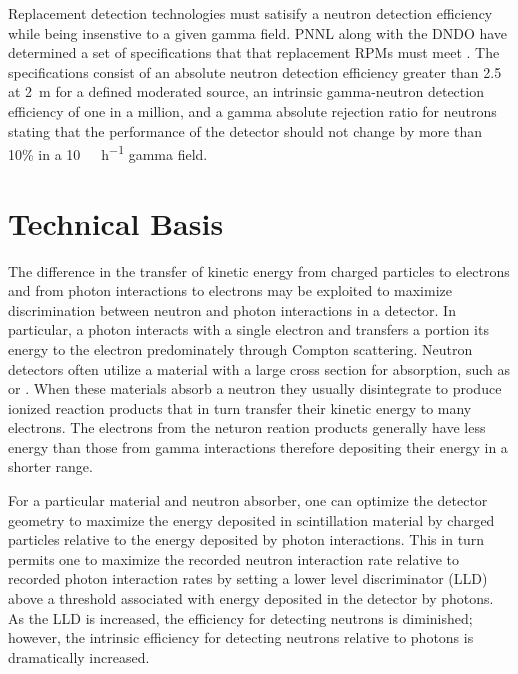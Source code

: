 \documentclass[draftcls,onecolumn]{IEEEtran}
\begin{document}
Replacement detection technologies must satisify a neutron detection efficiency while being insenstive to a given gamma field.
PNNL along with the DNDO have determined a set of specifications that that replacement RPMs must meet \cite{kouzes_neutron_2010, kouzes_neutron_1999}. 
The specifications consist of an absolute neutron detection efficiency greater than \SI{2.5}{\cps} at \SI{2}{\meter} for a defined moderated source, an intrinsic gamma-neutron detection efficiency of one in a million, and a gamma absolute rejection ratio for neutrons stating that the performance of the detector should not change by more than 10\% in a \SI{10}{\milli\roetgen\per\hour} gamma field.

\section{Technical Basis}
The difference in the transfer of kinetic energy from charged particles to electrons and from photon interactions to electrons may be exploited to maximize discrimination between neutron and photon interactions in a detector.  
In particular, a photon interacts with a single electron and transfers a portion its energy to the electron predominately through Compton scattering. 
Neutron detectors often utilize a material with a large cross section for absorption, such as  or .
When these materials absorb a neutron they usually disintegrate to produce ionized reaction products that in turn transfer their kinetic energy to many electrons.
The electrons from the neturon reation products generally have less energy than those from gamma interactions therefore depositing their energy in a shorter range.

For a particular material and neutron absorber, one can optimize the detector geometry to maximize the energy deposited in scintillation material by charged particles relative to the energy deposited by photon interactions. 
This in turn permits one to maximize the recorded neutron interaction rate relative to recorded photon interaction rates by setting a lower level discriminator (LLD) above a threshold associated with energy deposited in the detector by photons.  
As the LLD is increased, the efficiency for detecting neutrons is diminished; however, the intrinsic efficiency for detecting neutrons relative to photons is dramatically increased. 
\end{document}
